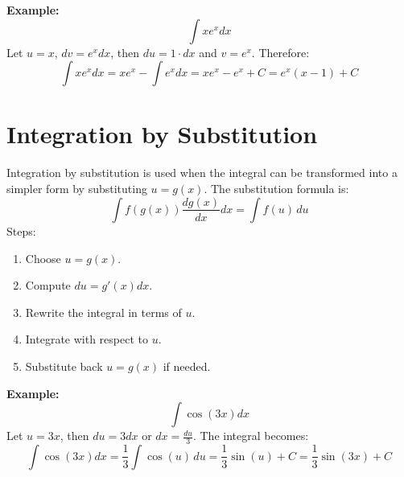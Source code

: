 \documentclass[]{article}
\begin{document}
	\noindent \textbf{Example:}
	$$
	\int x e^x dx
	$$
	Let $u = x$, $dv = e^x dx$, then $du = 1 \cdot dx$ and $v = e^x$. Therefore:
	$$
	\int x e^x dx = x e^x - \int e^x dx = x e^x - e^x + C = e^x(x-1) + C
	$$
	
	\section{Integration by Substitution}
	Integration by substitution is used when the integral can be transformed into a simpler form by substituting $u = g(x)$. The substitution formula is:
	$$
	\int f(g(x)) \frac{d g(x)}{dx} dx = \int f(u)\,du
	$$
	Steps:
	\begin{enumerate}
		\item Choose $u = g(x)$.
		\item Compute $du = g'(x) dx$.
		\item Rewrite the integral in terms of $u$.
		\item Integrate with respect to $u$.
		\item Substitute back $u = g(x)$ if needed.
	\end{enumerate}
	\textbf{Example:}
	$$
	\int \cos(3x) dx
	$$
	Let $u = 3x$, then $du = 3 dx$ or $dx = \frac{du}{3}$.
	The integral becomes:
	$$
	\int \cos(3x) dx = \frac{1}{3} \int \cos(u)\,du = \frac{1}{3}\sin(u) + C = \frac{1}{3}\sin(3x) + C
	$$
	
	
\end{document}
